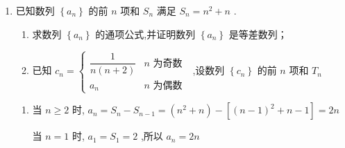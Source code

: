 \begin{enumerate}
    \item 已知数列 $\left\{  {a}_{n}\right\}$ 的前 $n$ 项和 ${S}_{n}$ 满足 ${S}_{n} = {n}^{2} + n$ .
    \begin{enumerate}
        \item 求数列 $\left\{  {a}_{n}\right\}$ 的通项公式,并证明数列 $\left\{  {a}_{n}\right\}$ 是等差数列；
        \item 已知 ${c}_{n} = \left\{  \begin{matrix} \dfrac{1}{n\left( {n + 2}\right) } & n\text{ 为奇数 } \\  {a}_{n} & n\text{ 为偶数 } \end{matrix}\right.$ ,设数列 $\left\{  {c}_{n}\right\}$ 的前 $n$ 项和 ${T}_{n}$
    \end{enumerate}
    \begin{jieda}
        \begin{enumerate}
            \item 当 $n \geq  2$ 时, ${a}_{n} = {S}_{n} - {S}_{n - 1} = \left( {{n}^{2} + n}\right)  - \left\lbrack  {{\left( n - 1\right) }^{2} + n - 1}\right\rbrack   = {2n}$ 
            
            当 $n = 1$ 时, ${a}_{1} = {S}_{1} = 2$ ,所以 ${a}_{n} = {2n}$
        

\end{enumerate}
\end{jieda}
\end{enumerate}
